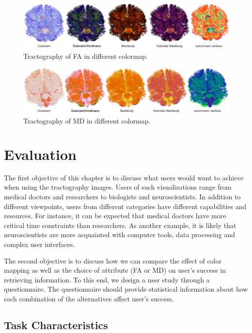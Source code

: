 \documentclass[hyperref, plainreport, noproblem]{cgvpub1}
\begin{document}
\begin{figure}[ht]
    \centering
    \includegraphics[width = 0.9\columnwidth]{7}
    \caption{Tractography of FA in different colormap.}
    \label{fig:7}
\end{figure}

\begin{figure}[ht]
    \centering
    \includegraphics[width = 0.9\columnwidth]{8}
    \caption{Tractography of MD in different colormap.}
    \label{fig:8}
\end{figure}

\chapter{Evaluation}

The first objective of this chapter is to discuss what users would want to achieve when using the tractography images. Users of such visualizations range from medical doctors and researchers to biologists and neuroscientists. In addition to different viewpoints, users from different categories have different capabilities and resources. For instance, it can be expected that medical doctors have more critical time constraints than researchers. As another example, it is likely that neuroscientists are more acquainted with computer tools, data processing and complex user interfaces.

The second objective is to discuss how we can compare the effect of color mapping as well as the choice of attribute (FA or MD) on user's success in retrieving information. To this end, we design a user study through a questionnaire. The questionnaire should provide statistical information about how each combination of the alternatives affect user's success. 

\section{Task Characteristics}
\end{document}
